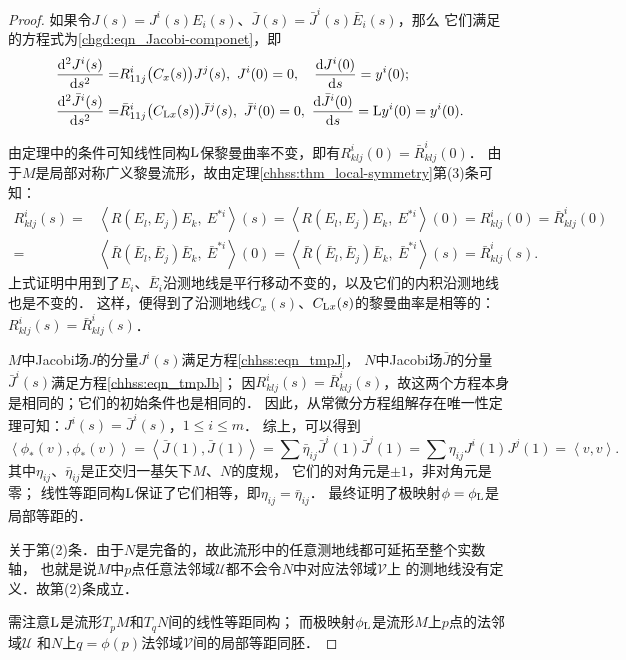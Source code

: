 \begin{proof}
    如果令$J(s)= J^i(s) E_i(s)$、$\bar{J}(s)= \bar{J}^i(s) \bar{E}_i(s)$，那么
    它们满足的方程式为\eqref{chgd:eqn_Jacobi-componet}，即
    \begin{align}
        \frac{{\rm d}^2 J^i(s)}{{\rm d} s^2} =& R^i_{11j}\bigl(C_x(s)\bigr) J^j(s) , 
        \ J^i(0)=0,\quad \frac{{\rm d} J^i(0)}{{\rm d}s} = y^i(0) ; \label{chhss:eqn_tmpJ} \\
        \frac{{\rm d}^2 \bar{J}^i(s)}{{\rm d} s^2} =& \bar{R}^i_{11j}\bigl(C_{{\rm L}x}(s)\bigr) \bar{J}^j(s) , 
        \ \bar{J}^i(0)=0,\ \frac{{\rm d} \bar{J}^i(0)}{{\rm d}s} = {\rm L}y^i(0) = y^i(0) .
        \label{chhss:eqn_tmpJb}
    \end{align}
    
     由定理中的条件可知线性同构$\rm L$保黎曼曲率不变，即有$R^i_{klj}(0)=\bar{R}^i_{klj}(0)$．
    由于$M$是{\kaishu 局部对称}广义黎曼流形，故由定理\ref{chhss:thm_local-symmetry}第(3)条可知：
    \begin{align*}
        R^i_{klj}(s)=&\left<R(E_l,E_j)E_k,\ E^{*i}\right>(s)=\left<R(E_l,E_j)E_k,\ E^{*i}\right>(0)
        =R^i_{klj}(0)=\bar{R}^i_{klj}(0) \\
        =&\left<\bar{R}(\bar{E}_l,\bar{E}_j)\bar{E}_k ,\ \bar{E}^{*i}\right>(0)
        =\left<\bar{R}(\bar{E}_l,\bar{E}_j)\bar{E}_k,\ \bar{E}^{*i}\right>(s)
        =\bar{R}^i_{klj}(s) .
    \end{align*}
    上式证明中用到了$E_i$、$\bar{E}_i$沿测地线是平行移动不变的，以及它们的内积沿测地线也是不变的．
    这样，便得到了沿测地线$C_x(s)$、$C_{{\rm L}x}(s)$的黎曼曲率是相等的：$R^i_{klj}(s)=\bar{R}^i_{klj}(s)$．
    
     $M$中Jacobi场$J$的分量$J^i(s)$满足方程\eqref{chhss:eqn_tmpJ}，
    $N$中Jacobi场$\bar{J}$的分量$\bar{J}^i(s)$满足方程\eqref{chhss:eqn_tmpJb}；
    因$R^i_{klj}(s)=\bar{R}^i_{klj}(s)$，故这两个方程本身是相同的；它们的初始条件也是相同的．
    因此，从常微分方程组解存在唯一性定理可知：$J^i(s)=\bar{J}^i(s)$，$1\leqslant i \leqslant m$．
    综上，可以得到
    \setlength{\mathindent}{0em}
    \begin{equation*}
        \left<\phi_{*} (v),\phi_{*} (v)\right>  =\left<\bar{J}(1),\bar{J}(1)\right>
        =\sum \bar{\eta}_{ij} \bar{J}^i(1)\bar{J}^j(1) =\sum \eta_{ij} J^i(1)J^j(1)
        =\left<v,v\right> .
    \end{equation*}\setlength{\mathindent}{2em}
    其中$\eta_{ij}$、$\bar{\eta}_{ij}$是正交归一基矢下$M$、$N$的度规，
    它们的对角元是$\pm 1$，非对角元是零；
    线性等距同构$\rm L$保证了它们相等，即$\eta_{ij}=\bar{\eta}_{ij}$．
    最终证明了极映射$\phi=\phi_{{\rm L}}$是局部等距的．
    
    
     关于第(2)条．由于$N$是完备的，故此流形中的任意测地线都可延拓至整个实数轴，
    也就是说$M$中$p$点任意法邻域$\mathscr{U}$都不会令$N$中对应法邻域$\mathscr{V}$上
    的测地线没有定义．故第(2)条成立．
    
    需注意$\rm L$是流形$T_p M$和$T_q N$间的线性等距同构；
    而极映射$\phi_{{\rm L}}$是流形$M$上$p$点的法邻域$\mathscr{U}$
    和$N$上$q=\phi(p)$法邻域$\mathscr{V}$间的局部等距同胚．
\end{proof}


